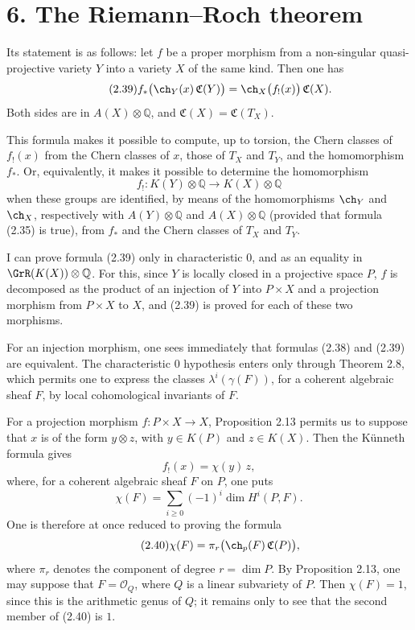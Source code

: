 \section*{6. The Riemann--Roch theorem}

Its statement is as follows: let \(f\) be a proper morphism from a non-singular quasi-projective variety \(Y\) into a variety \(X\) of the same kind. Then one has
\begin{equation}\tag{2.39}
 f_*\bigl(\ch_Y(x)\,\mathfrak C(Y)\bigr)
 =
 \ch_X\bigl(f_!(x)\bigr)\,\mathfrak C(X).
\end{equation}
Both sides are in \(A(X)\otimes \mathbb Q\), and \(\mathfrak C(X)=\mathfrak C(T_X)\).

This formula makes it possible to compute, up to torsion, the Chern classes of \(f_!(x)\) from the Chern classes of \(x\), those of \(T_X\) and \(T_Y\), and the homomorphism \(f_*\). Or, equivalently, it makes it possible to determine the homomorphism
\[
  f_!:K(Y)\otimes \mathbb Q \longrightarrow K(X)\otimes \mathbb Q
\]
when these groups are identified, by means of the homomorphisms \(\ch_Y\) and \(\ch_X\), respectively with \(A(Y)\otimes \mathbb Q\) and \(A(X)\otimes \mathbb Q\) (provided that formula (2.35) is true), from \(f_*\) and the Chern classes of \(T_X\) and \(T_Y\).

I can prove formula (2.39) only in characteristic \(0\), and as an equality in \(\GrR(K(X))\otimes\mathbb Q\). For this, since \(Y\) is locally closed in a projective space \(P\), \(f\) is decomposed as the product of an injection of \(Y\) into \(P\times X\) and a projection morphism from \(P\times X\) to \(X\), and (2.39) is proved for each of these two morphisms.

For an injection morphism, one sees immediately that formulas (2.38) and (2.39) are equivalent. The characteristic \(0\) hypothesis enters only through Theorem 2.8, which permits one to express the classes \(\lambda^i(\gamma(F))\), for a coherent algebraic sheaf \(F\), by local cohomological invariants of \(F\).

For a projection morphism \(f:P\times X\to X\), Proposition 2.13 permits us to suppose that \(x\) is of the form \(y\otimes z\), with \(y\in K(P)\) and \(z\in K(X)\). Then the Künneth formula gives
\[
  f_!(x)=\chi(y)\,z,
\]
where, for a coherent algebraic sheaf \(F\) on \(P\), one puts
\[
  \chi(F)=\sum_{i\geq 0}(-1)^i\dim H^i(P,F).
\]
One is therefore at once reduced to proving the formula
\begin{equation}\tag{2.40}
  \chi(F)=\pi_r\bigl(\ch_p(F)\,\mathfrak C(P)\bigr),
\end{equation}
where \(\pi_r\) denotes the component of degree \(r=\dim P\). By Proposition 2.13, one may suppose that \(F=\mathcal O_Q\), where \(Q\) is a linear subvariety of \(P\). Then \(\chi(F)=1\), since this is the arithmetic genus of \(Q\); it remains only to see that the second member of (2.40) is \(1\).

